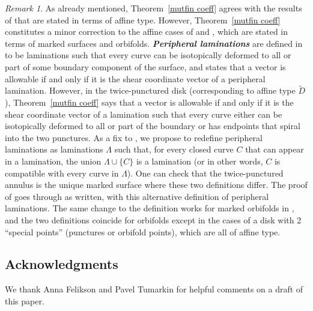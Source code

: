 \documentclass{amsart}
\theoremstyle{definition}
\theoremstyle{remark}
\newtheorem{remark}[proposition]{Remark}
\numberwithin{equation}{section}
\newcommand{\newword}[1]{\textbf{\emph{#1}}}
\newcommand{\set}[1]{{\lbrace #1 \rbrace}}
\newcommand{\0}{{\mathbf{0}}}
\begin{document}
\begin{remark}\label{correction}
As already mentioned, Theorem~\ref{mutfin coeff} agrees with the results of \cite{FeTuCoeff} that are stated in terms of affine type.
However, Theorem~\ref{mutfin coeff} constitutes a minor correction to the affine cases of \cite[Theorem~3.2]{FeTuCoeff} and \cite[Theorem~9.2]{FeTuCoeff}, which are stated in terms of marked surfaces and orbifolds.
\newword{Peripheral laminations} are defined in~\cite{FeTuCoeff} to be laminations such that every curve can be isotopically deformed to all or part of some boundary component of the surface, and \cite[Theorem~3.2]{FeTuCoeff} states that a vector is allowable if and only if it is the shear coordinate vector of a peripheral lamination.
However, in the twice-punctured disk (corresponding to affine type $\widetilde D$), Theorem~\ref{mutfin coeff} says that a vector is allowable if and only if it is the shear coordinate vector of a lamination such that every curve either can be isotopically deformed to all or part of the boundary or has endpoints that spiral into the two punctures.
As a fix to \cite[Theorem~3.2]{FeTuCoeff}, we propose to redefine peripheral laminations as laminations $\Lambda$ such that, for every closed curve $C$ that can appear in a lamination, the union $\Lambda\cup\set{C}$ is a lamination (or in other words, $C$ is compatible with every curve in $\Lambda$).
One can check that the twice-punctured annulus is the unique marked surface where these two definitions differ.  
The proof of \cite[Theorem~3.2]{FeTuCoeff} goes through as written, with this alternative definition of peripheral laminations.
The same change to the definition works for marked orbifolds in \cite[Theorem~9.2]{FeTuCoeff}, and the two definitions coincide for orbifolds except in the cases of a disk with 2 ``special points'' (punctures or orbifold points), which are all of affine type.
\end{remark}


\subsection*{Acknowledgments}
We thank Anna Felikson and Pavel Tumarkin for helpful comments on a draft of this paper.




\vspace{-0.175 em}
\end{document}
